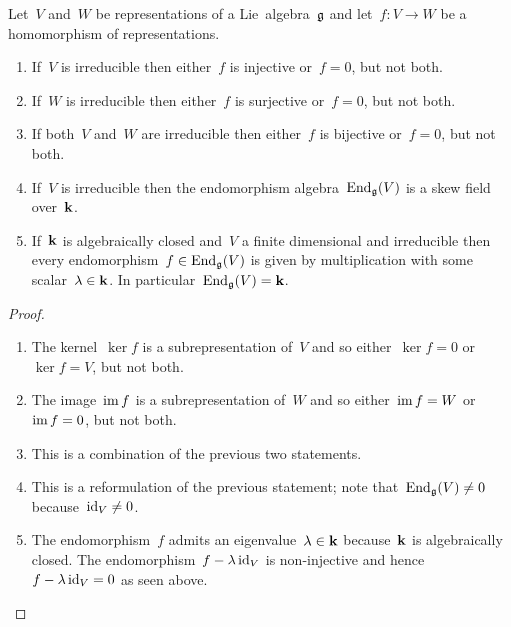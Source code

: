 \begin{lemma}[Schur]
  Let~$V$ and~$W$ be representations of a Lie~algebra~$\mathfrak{g}$ and let~$f \colon V \to W$ be a homomorphism of representations.
  \begin{enumerate}
    \item
      If~$V$ is irreducible then either~$f$ is injective or~$f = 0$, but not both.
    \item
      If~$W$ is irreducible then either~$f$ is surjective or~$f = 0$, but not both.
    \item
      If both~$V$ and~$W$ are irreducible then either~$f$ is bijective or~$f = 0$, but not both.
    \item
      If~$V$ is irreducible then the endomorphism algebra~$\operatorname{End}_{\mathfrak{g}}(V)$ is a skew field over~$\mathbf{k}$.
    \item
      If~$\mathbf{k}$ is algebraically closed and~$V$ a finite dimensional and irreducible then every endomorphism~$f \in \operatorname{End}_{\mathfrak{g}}(V)$ is given by multiplication with some scalar~$\lambda \in \mathbf{k}$.
      In particular~$\operatorname{End}_{\mathfrak{g}}(V) = \mathbf{k}$.
  \end{enumerate}
\end{lemma}


\begin{proof}
  \leavevmode
  \begin{enumerate}
    \item
      The kernel~$\ker f$ is a subrepresentation of~$V$ and so either~$\ker f = 0$ or~$\ker f = V$, but not both.
    \item
      The image~$\operatorname{im} f$ is a subrepresentation of~$W$ and so either~$\operatorname{im} f = W$ or~$\operatorname{im} f = 0$, but not both.
    \item
      This is a combination of the previous two statements.
    \item
      This is a reformulation of the previous statement;
      note that~$\operatorname{End}_{\mathfrak{g}}(V) \neq 0$ because~$\operatorname{id}_V \neq 0$.
    \item
      The endomorphism~$f$ admits an eigenvalue~$\lambda \in \mathbf{k}$ because~$\mathbf{k}$ is algebraically closed.
      The endomorphism~$f - \lambda \operatorname{id}_V$ is non-injective and hence~$f - \lambda \operatorname{id}_V = 0$ as seen above.
    \qedhere
  \end{enumerate}
\end{proof}




